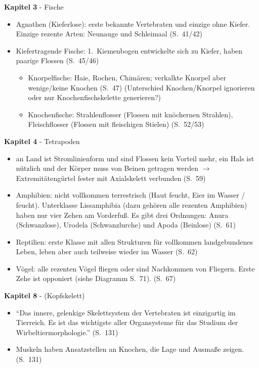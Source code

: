 \textbf{Kapitel 3} - Fische
\begin{itemize}
 \item Agnathen (Kieferlose): erste bekannte Vertebraten und einzige ohne Kiefer. Einzige rezente Arten: Neunauge und Schleimaal (S.\ 41/42)
 \item Kiefertragende Fische: 1.\ Kiemenbogen entwickelte sich zu Kiefer, haben paarige Flossen (S.\ 45/46)
 \begin{itemize}
  \item Knorpelfische: Haie, Rochen, Chimären; verkalkte Knorpel aber wenige/keine Knochen (S.\ 47) (Unterschied Knochen/Knorpel ignorieren oder nur Knochenfischskelette generieren?)
  \item Knochenfische: Strahlenflosser (Flossen mit knöchernen Strahlen), Fleischflosser (Flossen mit fleischigen Stielen) (S.\ 52/53)
 \end{itemize}
\end{itemize}

\textbf{Kapitel 4} - Tetrapoden
\begin{itemize}
 \item an Land ist Stromlinienform und sind Flossen kein Vorteil mehr, ein Hals ist nützlich und der Körper muss von Beinen getragen werden $\rightarrow$ Extremitätengürtel fester mit Axialskelett verbunden (S.\ 59)
 \item Amphibien: nicht vollkommen terrestrisch (Haut feucht, Eier im Wasser / feucht). Unterklasse Lissamphibia (dazu gehören alle rezenten Amphibien) haben nur vier Zehen am Vorderfuß. Es gibt drei Ordnungen: Anura (Schwanzlose), Urodela (Schwanzlurche) und Apoda (Beinlose) (S.\ 61)
 \item Reptilien: erste Klasse mit allen Strukturen für vollkommen landgebundenes Leben, leben aber auch teilweise wieder im Wasser (S.\ 62)
 \item Vögel: alle rezenten Vögel fliegen oder sind Nachkommen von Fliegern. Erste Zehe ist opponiert (siehe Diagramm S.\ 71). (S.\ 67)
\end{itemize}

\textbf{Kapitel 8} - (Kopfskelett)
\begin{itemize}
 \item "`Das innere, gelenkige Skelettsystem der Vertebraten ist einzigartig im Tierreich. Es ist das wichtigste aller Organsysteme für das Studium der Wirbeltiermorphologie."' (S.\ 131)
 \item Muskeln haben Ansatzstellen an Knochen, die Lage und Ausmaße zeigen. (S.\ 131)
\end{itemize}

